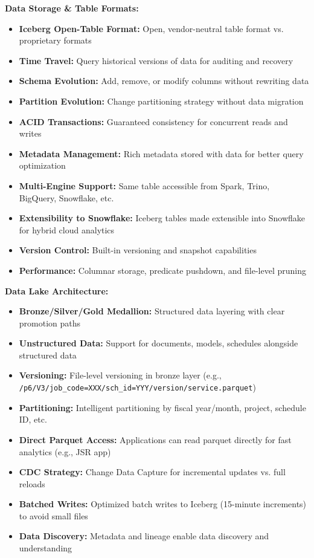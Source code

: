 \documentclass[10pt, a4paper]{article}
\begin{document}
{\hspace{1em}\textbf{Data Storage \& Table Formats:}
\begin{itemize}[leftmargin=2.5em, itemsep=0.05em]
    \item \textbf{Iceberg Open-Table Format:} Open, vendor-neutral table format vs. proprietary formats
    \item \textbf{Time Travel:} Query historical versions of data for auditing and recovery
    \item \textbf{Schema Evolution:} Add, remove, or modify columns without rewriting data
    \item \textbf{Partition Evolution:} Change partitioning strategy without data migration
    \item \textbf{ACID Transactions:} Guaranteed consistency for concurrent reads and writes
    \item \textbf{Metadata Management:} Rich metadata stored with data for better query optimization
    \item \textbf{Multi-Engine Support:} Same table accessible from Spark, Trino, BigQuery, Snowflake, etc.
    \item \textbf{Extensibility to Snowflake:} Iceberg tables made extensible into Snowflake for hybrid cloud analytics
    \item \textbf{Version Control:} Built-in versioning and snapshot capabilities
    \item \textbf{Performance:} Columnar storage, predicate pushdown, and file-level pruning
\end{itemize}

\vspace{0.15em}

\hspace{1em}\textbf{Data Lake Architecture:}
\begin{itemize}[leftmargin=2.5em, itemsep=0.05em]
    \item \textbf{Bronze/Silver/Gold Medallion:} Structured data layering with clear promotion paths
    \item \textbf{Unstructured Data:} Support for documents, models, schedules alongside structured data
    \item \textbf{Versioning:} File-level versioning in bronze layer (e.g., \texttt{/p6/V3/job\_code=XXX/sch\_id=YYY/version/service.parquet})
    \item \textbf{Partitioning:} Intelligent partitioning by fiscal year/month, project, schedule ID, etc.
    \item \textbf{Direct Parquet Access:} Applications can read parquet directly for fast analytics (e.g., JSR app)
    \item \textbf{CDC Strategy:} Change Data Capture for incremental updates vs. full reloads
    \item \textbf{Batched Writes:} Optimized batch writes to Iceberg (15-minute increments) to avoid small files
    \item \textbf{Data Discovery:} Metadata and lineage enable data discovery and understanding
\end{itemize}

}
\end{document}

